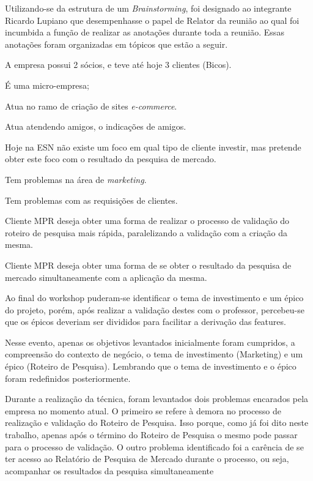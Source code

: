 		Utilizando-se da estrutura de um \textit{Brainstorming}, foi designado ao integrante Ricardo Lupiano que desempenhasse o papel de Relator da reunião ao qual foi incumbida a função de realizar as anotações durante toda a reunião. Essas anotações foram organizadas em tópicos que estão a seguir.

		\begin{itemize}
		{
			\item A empresa possui 2 sócios, e teve até hoje 3 clientes (Bicos).
			\item É uma micro-empresa;
			\item Atua no ramo de criação de sites \textit{e-commerce}.
			\item Atua atendendo amigos, o indicações de amigos.
			\item Hoje na ESN não existe um foco em qual tipo de cliente investir, mas pretende obter este foco com o resultado da pesquisa de mercado.
			\item Tem problemas na área de \textit{marketing}.
			\item Tem problemas com as requisições de clientes.
			\item Cliente MPR deseja obter uma forma de realizar o processo de validação do roteiro de pesquisa mais rápida, paralelizando a validação com a criação da mesma.
			\item Cliente MPR deseja obter uma forma de se obter o resultado da pesquisa de mercado simultaneamente com a aplicação da mesma.
		}
		\end{itemize}

		Ao final do workshop puderam-se identificar o tema de investimento e um épico do projeto, porém, após realizar a validação destes com o professor, percebeu-se que os épicos deveriam ser divididos para facilitar a derivação das features.
		
		Nesse evento, apenas os objetivos levantados inicialmente foram cumpridos, a compreensão do contexto de negócio, o tema de investimento (Marketing) e um épico (Roteiro de Pesquisa). Lembrando que o tema de investimento e o épico foram redefinidos posteriormente.
		
		Durante a realização da técnica, foram levantados dois problemas encarados pela empresa no momento atual. O primeiro se refere à demora no processo de realização e validação do Roteiro de Pesquisa. Isso porque, como já foi dito neste trabalho, apenas após o término do Roteiro de Pesquisa o mesmo pode passar para o processo de validação. O outro problema identificado foi a carência de se ter acesso ao Relatório de Pesquisa de Mercado durante o processo, ou seja, acompanhar os resultados da pesquisa simultaneamente

